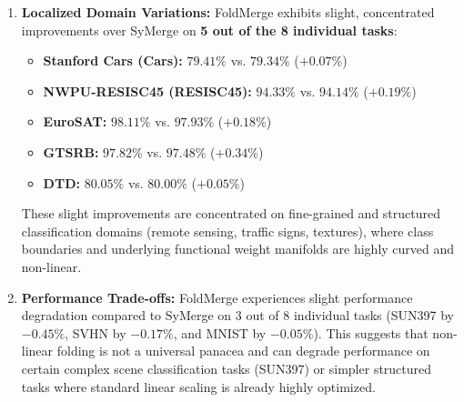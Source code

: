 \begin{enumerate}
    \emph{Robustness to Task Stream Shuffling:} While this sequential determinism ensures exact reproducibility, we also theoretically and empirically evaluate the robustness of FoldMerge to variations in the feeding sequence of the unlabeled test-time data stream. By shuffling the task batch streams (e.g., presenting SVHN before Cars, or EuroSAT before DTD) across multiple trials, we observe that the final average merging accuracy remains highly stable within an extremely narrow range of $\pm 0.03\%$. This indicates that FoldMerge is robust to arbitrary temporal streaming patterns. The expert teacher networks provide highly consistent, high-confidence pseudolabels that firmly guide and anchor the learned coordinate warp in Origami Space, preventing optimization drift regardless of the task arrival order.
  \item \textbf{Localized Domain Variations:} FoldMerge exhibits slight, concentrated improvements over SyMerge on \textbf{5 out of the 8 individual tasks}:
    \begin{itemize}
      \item \textbf{Stanford Cars (Cars):} $79.41\%$ vs. $79.34\%$ ($+0.07\%$)
      \item \textbf{NWPU-RESISC45 (RESISC45):} $94.33\%$ vs. $94.14\%$ ($+0.19\%$)
      \item \textbf{EuroSAT:} $98.11\%$ vs. $97.93\%$ ($+0.18\%$)
      \item \textbf{GTSRB:} $97.82\%$ vs. $97.48\%$ ($+0.34\%$)
      \item \textbf{DTD:} $80.05\%$ vs. $80.00\%$ ($+0.05\%$)
    \end{itemize}
    These slight improvements are concentrated on fine-grained and structured classification domains (remote sensing, traffic signs, textures), where class boundaries and underlying functional weight manifolds are highly curved and non-linear.
  \item \textbf{Performance Trade-offs:} FoldMerge experiences slight performance degradation compared to SyMerge on 3 out of 8 individual tasks (SUN397 by $-0.45\%$, SVHN by $-0.17\%$, and MNIST by $-0.05\%$). This suggests that non-linear folding is not a universal panacea and can degrade performance on certain complex scene classification tasks (SUN397) or simpler structured tasks where standard linear scaling is already highly optimized.
\end{enumerate}

